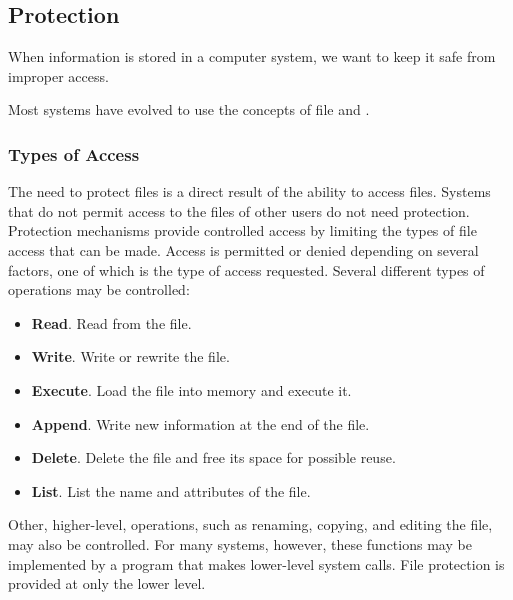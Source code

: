 \subsection{Protection}\label{subsec:File_Protection}
When information is stored in a computer system, we want to keep it safe from improper access.

Most systems have evolved to use the concepts of file  and .

\subsubsection{Types of Access}\label{subsubsec:Types_File_Access}
The need to protect files is a direct result of the ability to access files.
Systems that do not permit access to the files of other users do not need protection.
Protection mechanisms provide controlled access by limiting the types of file access that can be made.
Access is permitted or denied depending on several factors, one of which is the type of access requested.
Several different types of operations may be controlled:
\begin{itemize}[noitemsep]
\item \textbf{Read}.
 Read from the file.
\item \textbf{Write}.
 Write or rewrite the file.
\item \textbf{Execute}.
 Load the file into memory and execute it.
\item \textbf{Append}.
 Write new information at the end of the file.
\item \textbf{Delete}.
 Delete the file and free its space for possible reuse.
\item \textbf{List}.
 List the name and attributes of the file.
\end{itemize}

Other, higher-level, operations, such as renaming, copying, and editing the file, may also be controlled.
For many systems, however, these functions may be implemented by a program that makes lower-level system calls.
File protection is provided at only the lower level.

